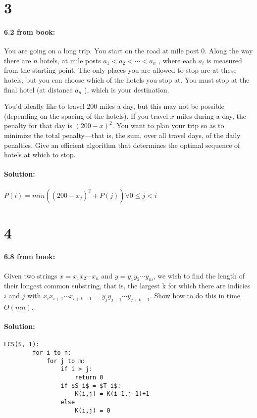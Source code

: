\documentclass[12pt]{article}
\newcommand{\BigO}[1]{\ensuremath{O(#1)}}
\begin{document}
\section*{3}
\paragraph{6.2 from book:}
You are going on a long trip. You start on the road at mile post 0.
Along the way there are $n$ hotels, at mile posts $a_1 < a_2 < \cdots <
a_n$ , where each $a_i$ is measured from the starting point. The only
places you are allowed to stop are at these hotels, but you can choose
which of the hotels you stop at. You must stop at the final hotel (at
distance $a_n$ ), which is your destination.

You’d ideally like to travel 200 miles a day, but this may not be
possible (depending on the spacing of the hotels). If you travel $x$ miles
during a day, the penalty for that day is $(200 - x)^2$.  You want to
plan your trip so as to minimize the total penalty—that is,
the sum, over all travel days, of the daily penalties.  Give an
efficient algorithm that determines the optimal sequence of hotels at
which to stop.

\paragraph{Solution:}
$P(i) = min ( (200-x_j)^{2} + P(j) ) \forall 0 \le j < i$

\section*{4}
\paragraph{6.8 from book:}
Given two strings $x = x_1 x_2 \cdots x_n$ and $y = y_1 y_2 \cdots y_m$,
we wish to find the length of their longest common substring, that is,
the largest k for which there are indicies $i$ and $j$ with $x_i x_{i + 1}
\cdots x_{i + k - 1}$ = $y_j y_{j + 1} \cdots y_{j + k - 1}$. Show how
to do this in time $\BigO{mn}$.

\paragraph{Solution:}
\begin{lstlisting}[mathescape]
    LCS(S, T):
        for i to n:
            for j to m:
                if i > j:
                    return 0
                if $S_i$ = $T_i$:
                    K(i,j) = K(i-1,j-1)+1
                else
                    K(i,j) = 0
\end{lstlisting}
\end{document}
